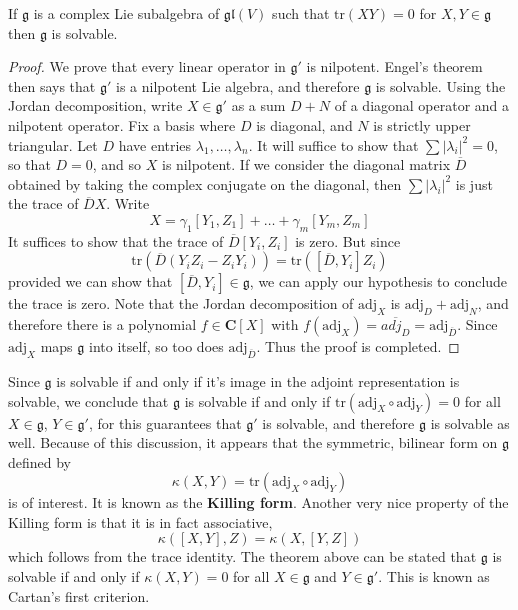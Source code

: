 \begin{theorem}
    If $\mathfrak{g}$ is a complex Lie subalgebra of $\mathfrak{gl}(V)$ such that $\text{tr}(XY) = 0$ for $X,Y \in \mathfrak{g}$ then $\mathfrak{g}$ is solvable.
\end{theorem}
\begin{proof}
    We prove that every linear operator in $\mathfrak{g}'$ is nilpotent. Engel's theorem then says that $\mathfrak{g}'$ is a nilpotent Lie algebra, and therefore $\mathfrak{g}$ is solvable. Using the Jordan decomposition, write $X \in \mathfrak{g}'$ as a sum $D + N$ of a diagonal operator and a nilpotent operator. Fix a basis where $D$ is diagonal, and $N$ is strictly upper triangular. Let $D$ have entries $\lambda_1, \dots, \lambda_n$. It will suffice to show that $\sum |\lambda_i|^2 = 0$, so that $D = 0$, and so $X$ is nilpotent. If we consider the diagonal matrix $\overline{D}$ obtained by taking the complex conjugate on the diagonal, then $\sum |\lambda_i|^2$ is just the trace of $\overline{D}X$. Write
    \[ X = \gamma_1 [Y_1, Z_1] + \dots + \gamma_m [Y_m, Z_m] \]
    It suffices to show that the trace of $\overline{D}[Y_i,Z_i]$ is zero. But since
    \[ \text{tr}(\overline{D}(Y_iZ_i - Z_iY_i)) = \text{tr}([\overline{D}, Y_i]Z_i) \]
    provided we can show that $[\overline{D},Y_i] \in \mathfrak{g}$, we can apply our hypothesis to conclude the trace is zero. Note that the Jordan decomposition of $\text{adj}_X$ is $\text{adj}_D + \text{adj}_N$, and therefore there is a polynomial $f \in \mathbf{C}[X]$ with $f(\text{adj}_X) = \overline{adj_D} = \text{adj}_{\overline{D}}$. Since $\text{adj}_X$ maps $\mathfrak{g}$ into itself, so too does $\text{adj}_{\overline{D}}$. Thus the proof is completed.
\end{proof}

Since $\mathfrak{g}$ is solvable if and only if it's image in the adjoint representation is solvable, we conclude that $\mathfrak{g}$ is solvable if and only if $\text{tr}(\text{adj}_X \circ \text{adj}_Y) = 0$ for all $X \in \mathfrak{g}$, $Y \in \mathfrak{g}'$, for this guarantees that $\mathfrak{g}'$ is solvable, and therefore $\mathfrak{g}$ is solvable as well. Because of this discussion, it appears that the symmetric, bilinear form on $\mathfrak{g}$ defined by
%
\[ \kappa(X,Y) = \text{tr}(\text{adj}_X \circ \text{adj}_Y) \]
%
is of interest. It is known as the {\bf Killing form}. Another very nice property of the Killing form is that it is in fact associative,
%
\[ \kappa([X,Y],Z) = \kappa(X,[Y,Z]) \]
%
which follows from the trace identity. The theorem above can be stated that $\mathfrak{g}$ is solvable if and only if $\kappa(X,Y) = 0$ for all $X \in \mathfrak{g}$ and $Y \in \mathfrak{g}'$. This is known as Cartan's first criterion.

